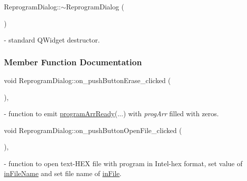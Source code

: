 \mbox{\label{classReprogramDialog_a5b8aa028f9c61b2c12c17242402c2199}} 
{\footnotesize\ttfamily Reprogram\+Dialog\+::\texorpdfstring{$\sim$\+Reprogram\+Dialog}{~ReprogramDialog} (\begin{DoxyParamCaption}{ }\end{DoxyParamCaption})} - standard Q\+Widget destructor.



\subsubsection{Member Function Documentation}
\mbox{\label{classReprogramDialog_a0180445b000071fee4185f70a264a418}} 
{\footnotesize\ttfamily void Reprogram\+Dialog\+::\texorpdfstring{on\+\_\+push\+Button\+Erase\+\_\+clicked}{on\_pushButtonErase\_clicked} (\begin{DoxyParamCaption}{ }\end{DoxyParamCaption})\hspace{0.3cm}{\ttfamily [private]}, {\ttfamily [slot]}} - function to emit \hyperlink{classReprogramDialog_a8a1f5e9816d7832931dc1da19c57b3ba}{program\+Arr\+Ready}(...) with \textit{prog\+Arr} filled with zeros. 

\mbox{\label{classReprogramDialog_a2b95a979bdf73a8c885446e483f272ac}} 
{\footnotesize\ttfamily void Reprogram\+Dialog\+::\texorpdfstring{on\+\_\+push\+Button\+Open\+File\+\_\+clicked}{on\_pushButtonOpenFile\_clicked} (\begin{DoxyParamCaption}{ }\end{DoxyParamCaption})\hspace{0.3cm}{\ttfamily [private]}, {\ttfamily [slot]}} - function to open text-HEX file with program in Intel-hex format, set value of \hyperlink{classReprogramDialog_ae56bcc760f9b1b305dc80756e7592ad7}{in\+File\+Name} and set file name of \hyperlink{classReprogramDialog_aeb56932944b2f861acffa0ab72a5a54f}{in\+File}.

